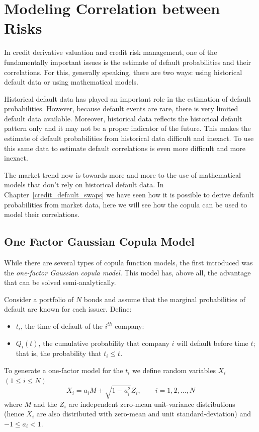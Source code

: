 \chapter{Modeling Correlation between Risks}

In credit derivative valuation and credit risk management, one of the
fundamentally important issues is the estimate of default
probabilities and their correlations. For this, generally speaking,
there are two ways: using historical default data or using mathematical
models.

Historical default data has played an important role in the estimation
of default probabilities. However, because default events are rare,
there is very limited default data available. Moreover, historical data
reflects the historical default pattern only and it may not be a proper
indicator of the future. This makes the estimate of default
probabilities from historical data difficult and inexact. To use this
same data to estimate default correlations is even more difficult and
more inexact.

The market trend now is towards more and more to the use of mathematical
models that don't rely on historical default data. In
Chapter~\ref{credit_default_swaps} we have seen how it is possible to derive default 
probabilities from market data,
here we will see how the copula can be used to model their correlations. 

\section{One Factor Gaussian Copula Model}\label{standard-market-model}
While there are several types of copula function models, the first
introduced was the \emph{one-factor Gaussian copula model}. This model has,
above all, the advantage that can be solved semi-analytically.

Consider a portfolio of \(N\) bonds and assume that the marginal
probabilities of default are known for each issuer. Define:

\begin{itemize}
	\tightlist
	\item
	\(t_i\), the time of default of the \(i^{th}\) company:
	\item
	\(Q_i(t)\), the cumulative probability that company \(i\) will default
	before time \(t\); that is, the probability that \(t_i \le t\).
\end{itemize}

To generate a one-factor model for the \(t_i\) we define random
variables \(X_i\) \((1\le i \le N)\)
\begin{equation}
X_i = a_i M + \sqrt{1-a_i^2}Z_i,\qquad i = 1, 2,\ldots, N
\label{eq:normalized_var}
\end{equation}
where \(M\) and the \(Z_i\) are independent zero-mean unit-variance  distributions (hence $X_i$ are also distributed with zero-mean and unit standard-deviation) and \(-1 \le a_i \lt 1\).

